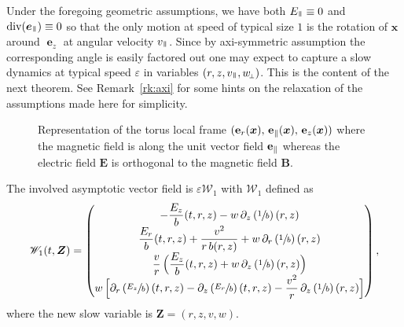 \documentclass[10pt]{amsart}
\let\mathcal\mathscr
\newcommand{\sperp}{{\scriptscriptstyle\perp}}
\let\eps\varepsilon
\let\d\partial
\DeclareMathOperator{\Div}{div}
\theoremstyle{plain}
\theoremstyle{definition}
\newcommand\bp{\begin{pmatrix}}
\newcommand\ep{\end{pmatrix}}
\newcommand\bB{{\boldsymbol B}}
\newcommand\bE{{\boldsymbol E}}
\newcommand\bfx{{\boldsymbol x}}
\newcommand\bfZ{{\boldsymbol Z}}
\newcommand\cW{{\mathcal W}}
\DeclareMathOperator{\beD}{\boldsymbol{e}}
\newcommand\eDz{\beD_z}
\newcommand\eDpar{\beD_\mypar}
\newcommand\vpar{v_\mypar}
\newcommand\eperp{w_{\!\sperp}}
\let\e w
\newcommand\Epar{E_\mypar}
\newcommand\Er{E_r}
\newcommand\Ez{E_z}
\newcommand{\mypar}{{\mkern3mu\vphantom{\perp}\vrule depth 0pt\mkern2mu\vrule depth 0pt\mkern3mu}}
\begin{document}
Under the foregoing geometric assumptions, we have both $\Epar\equiv0$ and $\Div(\eDpar)\equiv0$ so that the only motion at speed of typical size $1$ is the rotation of $\bfx$ around $\eDz$ at angular velocity $\vpar$. Since by axi-symmetric assumption the corresponding angle is easily factored out one may expect to capture a slow dynamics at typical speed $\eps$ in variables $(r,z,\vpar,\eperp)$. This is the content of the next theorem. See Remark~\ref{rk:axi} for some hints on the relaxation of the assumptions made here for simplicity.
\begin{figure}[htb]
\begin{center}
\vspace*{-\baselineskip}
\end{center}
\label{fig:1}
\caption{\smaller Representation of the torus local frame $({\bf e}_r(\bfx),\, {\bf
e}_\parallel(\bfx), \,{\bf e}_z(\bfx))$ where the magnetic
field is along the unit vector field ${\bf
e}_\parallel$ whereas the electric field $\bE$ is
orthogonal to the magnetic field $\bB$.}
\end{figure}

The involved asymptotic vector field is $\eps\cW_1$ with $\cW_1$ defined as
\[
\cW_1(t,\bfZ)
=\bp
-\dfrac{\Ez}{b}(t,r,z)-\e\,\d_z\left(\sfrac1b\right)(r,z)\\
\dfrac{\Er}{b}(t,r,z)+\dfrac{v^2}{r\,b(r,z)}
+\e\,\d_r\left(\sfrac1b\right)(r,z)
\\
\dfrac{v}{r}\,\Bigl(\dfrac{\Ez}{b}(t,r,z)
+\e\,\d_z\left(\sfrac1b\right)(r,z)\Bigr)\\
\e\,\Bigl[\d_r\left(\sfrac{\Ez}{b}\right)(t,r,z)-\d_z\left(\sfrac{\Er}{b}\right)(t,r,z)
-\dfrac{v^2}{r}\,\d_z\left(\sfrac1b\right)(r,z)\Bigr]
\ep,
\]
where the new slow variable is $\bfZ=(r,z,v,\e)$.
\end{document}
